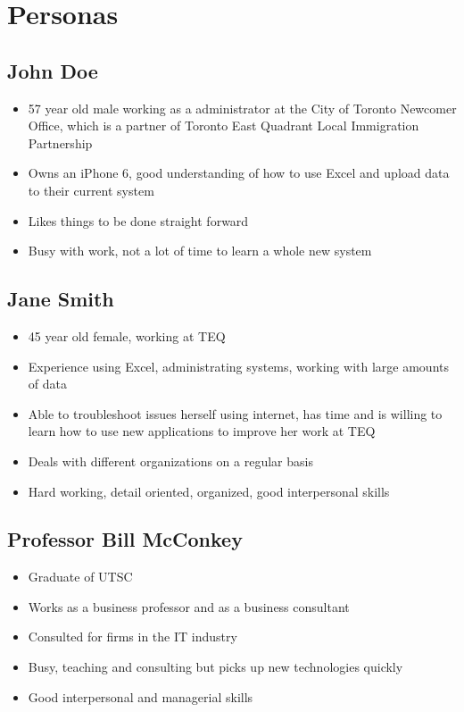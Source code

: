 \documentclass[12pt]{article}
\begin{document}
\textcolor{black}{\tableofcontents}
\pagebreak


\section{Personas}
\subsection{John Doe}
\begin{itemize}%
\item 57 year old male working as a administrator at the City of Toronto Newcomer Office, which is a partner of Toronto East Quadrant Local Immigration Partnership 
\item Owns an iPhone 6, good understanding of how to use Excel and upload data to their current system
\item Likes things to be done straight forward
\item Busy with work, not a lot of time to learn a whole new system
 \end{itemize}

\subsection{Jane Smith}
\begin{itemize}%
\item 45 year old female, working at TEQ
\item Experience using Excel, administrating systems, working with large amounts of data
\item Able to troubleshoot issues herself using internet, has time and is willing to learn how to use new applications to improve her work at TEQ
\item Deals with different organizations on a regular basis
\item Hard working, detail oriented, organized, good interpersonal skills
 \end{itemize}
 
 \subsection{Professor Bill McConkey}
\begin{itemize}%
\item Graduate of UTSC
\item Works as a business professor and as a business consultant	
\item Consulted for firms in the IT industry
\item Busy, teaching and consulting but picks up new technologies quickly
\item Good interpersonal and managerial skills
 \end{itemize}
\end{document}
